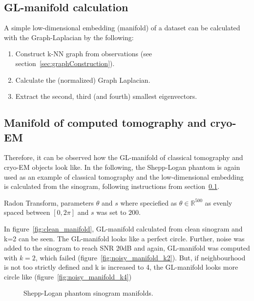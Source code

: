 \subsection{GL-manifold calculation}
\label{sec:manifold_calculation}
A simple low-dimensional embedding (manifold) of a dataset can be calculated with the Graph-Laplacian 
by the following:

\begin{enumerate}
    \item Construct k-NN graph from observations (see section~\ref{sec:graphConstruction}).
    \item Calculate the (normalized) Graph Laplacian.
    \item Extract the second, third (and fourth) smallest eigenvectors.
\end{enumerate}



\subsection{Manifold of computed tomography and cryo-EM}

Therefore, it can be observed how the GL-manifold of classical tomography and cryo-EM objects look like.
In the following, the Shepp-Logan phantom is again used as an example of classical tomography
and the low-dimensional embedding is calculated from the sinogram, following instructions from 
section~\ref{sec:manifold_calculation}.

Radon Transform, parameters $\theta$ and $s$ where speciefied as $\theta \in \mathbb{R}^{500}$ as evenly spaced
between $[0, 2 \pi]$ and $s$ was set to $200$. 

In figure~\ref{fig:clean_manifold}, GL-manifold calculated from clean sinogram and k=2 can be seen.
The GL-manifold looks like a perfect circle. Further, noise was added to the sinogram 
to reach SNR 20dB and again, GL-manifold was computed with $k=2$, which failed (figure~\ref{fig:noisy_manifold_k2}).
But, if neighbourhood is not too strictly defined and k is increased to 4, the GL-manifold looks more circle like 
(figure~\ref{fig:noisy_manifold_k4})

\begin{figure}[H]
    \centering
    \caption{Shepp-Logan phantom sinogram manifolds.}
\end{figure}

